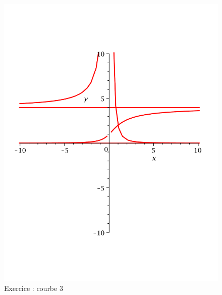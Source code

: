 \begin{figure}[ht]
   \centering
   \includegraphics[scale=0.25]{Ecr01_3.pdf}
   \caption{Exercice  : courbe 3}
\end{figure}
